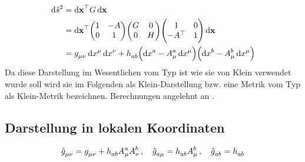 \begin{equation}
\begin{split}
\dif \hat{s}^2&=\dif \vec{x}\transpose G
\dif \vec{x}\\
&=\dif \vec{x}\transpose
\begin{pmatrix}1& -A\\0& 1\end{pmatrix}
\begin{pmatrix}G& 0\\0& H
\end{pmatrix}
\begin{pmatrix}1& 0\\-A\transpose& 1\end{pmatrix}
\dif \vec{x}\\
&=\tensor{g}{_\mu_\nu}\dif \tensor{x}{^\mu}\dif\tensor{x}{^\nu}
+\tensor{h}{_a_b}\left(\dif\tensor{x}{^a}-\tensor*{A}{^a_\mu}\dif\tensor{x}{^\mu}\right)
\left(\dif\tensor{x}{^b}-\tensor*{A}{^b_\mu}\dif\tensor{x}{^\mu}\right)
\end{split}
\end{equation}
Da diese Darstellung im Wesentlichen vom Typ ist wie sie von Klein verwendet
wurde soll wird sie im Folgenden als Klein-Darstellung bzw. eine Metrik vom Typ
als Klein-Metrik bezeichnen.
Berechnungen angelehnt an \cite{Coquereaux:1990qs} \cite{williams2015field}.
\subsection{Darstellung in lokalen Koordinaten}
\begin{equation}
\tensor{\hat{g}}{_\mu_\nu}=\tensor{g}{_\mu_\nu}+\tensor{h}{_a_b}\tensor{A}*{^a_\mu}\tensor*{A}{^b_\nu}\,,\quad
\tensor{\hat{g}}{_a_\mu}=\tensor{h}{_a_b}\tensor*{A}{^b_\mu}\,,\quad
\tensor{\hat{g}}{_a_b}=\tensor{h}{_a_b}
\end{equation}
